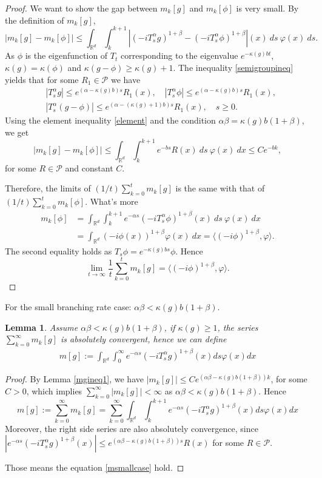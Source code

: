 \documentclass[12pt, a4paper]{amsart}
\newtheorem{lem}[thm]{Lemma}
\theoremstyle{definition}
\numberwithin{equation}{section}
\begin{document}
\begin{proof}
    We want to show the gap between $m_k[g]$ and $m_k[\phi]$ is very small. By the definition of $m_k[g]$, 
    $$|m_k[g]-m_k[\phi]|\leq\int_{\mathbb{R}^d}\int_k^{k+1}\left|(-i T^{\alpha}_s g)^{1+\beta}-(-i T^{\alpha}_s \phi)^{1+\beta}\right|(x)~ds~\varphi(x)~ds.$$
    As $\phi$ is the eigenfunction of $T_t$ corresponding to the eigenvalue $e^{-\kappa(g)bt}$,  $\kappa(g)=\kappa(\phi)$ and $\kappa(g-\phi)\geq \kappa(g)+1$. The inequality \eqref{semigroupineq} yields that for some $R_1\in\mathcal{P}$ we have
    \begin{align*}
        &|T_s^{\alpha}g|\leq e^{(\alpha-\kappa(g)b)s}R_1(x), \quad|T_s^{\alpha}\phi|\leq e^{(\alpha-\kappa(g)b)s}R_1(x), \\ 
        &|T_s^{\alpha}(g-\phi)|\leq e^{(\alpha-(\kappa(g)+1)b)s}R_1(x), \quad s\geq0.
    \end{align*}
  Using the element inequality \eqref{element} and the condition $\alpha\beta=\kappa(g)b(1+\beta)$, we get
    $$|m_k[g]-m_k[\phi]|\leq\int_{\mathbb{R}^d}\int_k^{k+1}e^{-bs}R(x)~ds~\varphi(x)~dx\leq C e^{-bk},$$
    for some $R\in\mathcal{P}$ and constant $C$.
    
    Therefore, the limits of $(1/t)\sum_{k=0}^tm_k[g]$ is the same with that of $(1/t)\sum_{k=0}^tm_k[\phi]$. What's more
    \begin{align*}
        m_k[\phi]&=\int_{\mathbb{R}^d}\int_k^{k+1} e^{-\alpha s}(-iT_{s}^{\alpha}\phi)^{1+\beta}(x)~ds~\varphi(x)~dx\\
        &=\int_{\mathbb{R}^d}(-i\phi(x))^{1+\beta}\varphi (x)~dx=\langle (-i\phi)^{1+\beta},\varphi\rangle.
    \end{align*}
    The second equality holds as $T_s\phi=e^{-\kappa(g)bs}\phi$. Hence
    $$\lim_{t\rightarrow \infty}\frac{1}{t}\sum_{k=0}^{t}m_k[g]=\langle(-i\phi)^{1+\beta},\varphi\rangle.$$
\end{proof}

For the small branching rate case: $\alpha\beta<\kappa(g)b(1+\beta)$.
\begin{lem}\label{lemma211}
Assume $\alpha\beta<\kappa(g)b(1+\beta)$, if $\kappa(g)\geq 1$, the series $\sum_{k=0}^{\infty}m_k[g]$ is absolutely convergent, hence we can define
\begin{align}
    m[g]:=\int_{\mathbb{R}^d}\int_0^{\infty} e^{-\alpha s}(-iT_{s}^{\alpha}g)^{1+\beta}(x)ds\varphi(x)dx \label{msmallcase}
\end{align}
\end{lem}
\begin{proof}
    By Lemma \ref{mgineq1}, we have $|m_k[g]|\leq C e^{(\alpha\beta-\kappa(g)b(1+\beta))k}$, for some $C>0$, which implies $\sum_{k=0}^{\infty}|m_k[g]|<\infty$ as $\alpha\beta<\kappa(g)b(1+\beta)$. Hence
    $$m[g]:=\sum_{k=0}^{\infty}m_k[g]=\sum_{k=0}^{\infty}\int_{\mathbb{R}^d}\int_k^{k+1} e^{-\alpha s}(-iT_{s}^{\alpha}g)^{1+\beta}(x)ds\varphi(x)dx$$
     Moreover, the right side series are also absolutely convergence, since $|e^{-\alpha s}(-iT_{s}^{\alpha}g)^{1+\beta}(x)|\leq e^{(\alpha\beta-\kappa(g)b(1+\beta))s}R(x)$ for some $R \in \mathcal{P}$. 
     
     Those means the equation \eqref{msmallcase} hold.
\end{proof}
\end{document}
